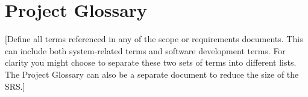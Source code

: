 \documentclass[12pt]{article}
\begin{document}
\section{Project Glossary}
[Define all terms referenced in any of the scope or requirements documents. This can include both system-related terms and software 
development terms. For clarity you might choose to separate these two sets of terms into different lists. The Project Glossary can 
also be a separate document to reduce the size of the SRS.]
\end{document}
